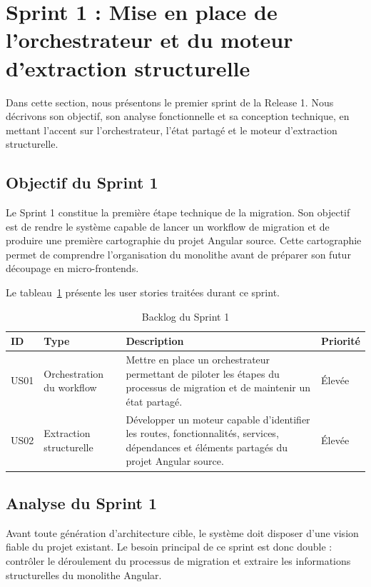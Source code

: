 \section{Sprint 1 : Mise en place de l'orchestrateur et du moteur d'extraction structurelle}

Dans cette section, nous présentons le premier sprint de la Release 1. Nous décrivons son objectif, son analyse fonctionnelle et sa conception technique, en mettant l'accent sur l'orchestrateur, l'état partagé et le moteur d'extraction structurelle.

\subsection{Objectif du Sprint 1}

Le Sprint 1 constitue la première étape technique de la migration. Son objectif est de rendre le système capable de lancer un workflow de migration et de produire une première cartographie du projet Angular source. Cette cartographie permet de comprendre l'organisation du monolithe avant de préparer son futur découpage en micro-frontends.

Le tableau~\ref{tab:backlog-sprint1-release1} présente les user stories traitées durant ce sprint.

\begingroup
\renewcommand{\arraystretch}{1.12}
\setlength{\tabcolsep}{4pt}
\begin{longtable}{|p{1.0cm}|p{3.5cm}|p{6.9cm}|p{1.15cm}|}
\caption{Backlog du Sprint 1}\label{tab:backlog-sprint1-release1}\\
\hline
\textbf{ID} & \textbf{Type} & \textbf{Description} & \textbf{Priorité} \\
\hline
US01 & Orchestration du workflow & Mettre en place un orchestrateur permettant de piloter les étapes du processus de migration et de maintenir un état partagé. & Élevée \\
\hline
US02 & Extraction structurelle & Développer un moteur capable d'identifier les routes, fonctionnalités, services, dépendances et éléments partagés du projet Angular source. & Élevée \\
\hline
\end{longtable}
\endgroup

\subsection{Analyse du Sprint 1}

Avant toute génération d'architecture cible, le système doit disposer d'une vision fiable du projet existant. Le besoin principal de ce sprint est donc double : contrôler le déroulement du processus de migration et extraire les informations structurelles du monolithe Angular.

